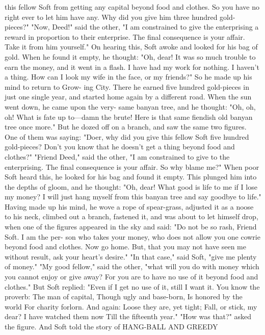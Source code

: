 \documentclass{book}
\begin{document}
this fellow Soft from getting any capital beyond food
and clothes. So you have no right ever to let him
have any. Why did you give him three hundred gold-
pieces?"
"Now, Deed!" said the other, "I am constrained
to give the enterprising a reward in proportion to their
enterprise. The final consequence is your affair. Take
it from him yourself." On hearing this, Soft awoke
and looked for his bag of gold.
When he found it empty, he thought: "Oh, dear!
It was so much trouble to earn the money, and it went
in a flash. I have had my work for nothing. I haven't
a thing. How can I look my wife in the face, or my
friends?" So he made up his mind to return to Grow-
ing City. There he earned five hundred gold-pieces
in just one single year, and started home again by a
different road.
When the sun went down, he came upon the very-
same banyan tree, and he thought: "Oh, oh, oh!
What is fate up to---damn the brute! Here is that
same fiendish old banyan tree once more." But he
dozed off on a branch, and saw the same two figures.
One of them was saying: "Doer, why did you give
this fellow Soft five hundred gold-pieces? Don't you
know that he doesn't get a thing beyond food and
clothes?"
"Friend Deed," said the other, "I am constrained
to give to the enterprising. The final consequence is
your affair. So why blame me?"
When poor Soft heard this, he looked for his bag
and found it empty. This plunged him into the
depths of gloom, and he thought: "Oh, dear! What
good is life to me if I lose my money? I will just hang
myself from this banyan tree and say goodbye to life."
Having made up his mind, he wove a rope of
spear-grass, adjusted it as a noose to his neck, climbed
out a branch, fastened it, and was about to let himself
drop, when one of the figures appeared in the sky and
said: "Do not be so rash, Friend Soft. I am the per-
son who takes your money, who does not allow you
one cowrie beyond food and clothes. Now go home.
But, that you may not have seen me without result,
ask your heart's desire."
"In that case," said Soft, "give me plenty of
money." "My good fellow," said the other, "what
will you do with money which you cannot enjoy or
give away? For you are to have no use of it beyond
food and clothes."
But Soft replied: "Even if I get no use of it, still
I want it. You know the proverb:
The man of capital,
Though ugly and base-born,
Is honored by the world
For charity forlorn.
And again:
Loose they are, yet tight;
Fall, or stick, my dear?
I have watched them now
Till the fifteenth year."
"How was that?" asked the figure. And Soft told
the story of
HANG-BALL AND GREEDY
\end{document}
